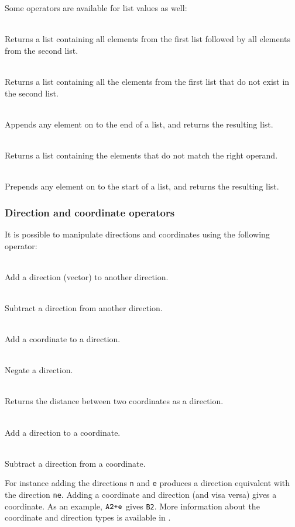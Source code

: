 Some operators are available for list values as well:
\begin{dlist}
\item {} \\
  Returns a list containing all elements from the first list followed
  by all elements from the second list.
\item {} \\
  Returns a list containing all the elements from the first list that
  do not exist in the second list.
\item {} \\
  Appends any element on to the end of a list, and returns the resulting list.
\item \operator[List]{-}{\opstar} \\
  Returns a list containing the elements that do not match the right operand.
\item {} \\
  Prepends any element on to the start of a list, and returns the resulting list.
\end{dlist}

\subsubsection{Direction and coordinate operators}

It is possible to manipulate directions and coordinates using the following operator:
\begin{dlist}
  \item {} \\
    Add a direction (vector) to another direction.
  \item {} \\
    Subtract a direction from another direction.
  \item {} \\
    Add a coordinate to a direction.
  \item {} \\
    Negate a direction.
  \item {} \\
    Returns the distance between two coordinates as a direction.
  \item {} \\
    Add a direction to a coordinate. 
  \item {} \\
    Subtract a direction from a coordinate.
\end{dlist}

For instance adding the directions \texttt{n} and \texttt{e} produces a
direction equivalent with the direction \texttt{ne}. Adding a coordinate and
direction (and visa versa) gives a coordinate. As an example, $\texttt{A2}
\verb!+! \texttt{e}$ gives \texttt{B2}. More information about the coordinate
and direction types is available in .
